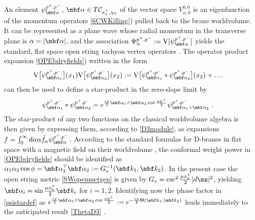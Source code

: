 An element $\psi_{\mbf\alpha}^{p^+,p^-}$, $\mbf\alpha\in
T\mathcal{C}_{x_0^+,\chi_0}$ of the vector space
$V_{\alpha,0}^{0,0}$ is an eigenfunction of the momentum operators
\eqref{6CWKilling}) pulled back to the brane worldvolume. It can be
represented as a plane wave whose radial momentum in the transverse
plane is $\alpha=|\mbf\alpha|$, and the association
$\Psi_{\alpha}^{p^+,p^-}:={\rm V}[\psi_{\mbf\alpha}^{p^+,p^-}]$ yields
the standard, flat space open string tachyon vertex
operators \cite{Schom1}. The operator product expansion
\eqref{OPEbdryfields}) written in the form
\begin{equation}
{\rm V}\bigl[\psi_{\mbf\alpha_1}^{p^+,p^-}\bigr](x_1) {\rm V}
\bigl[\psi_{\mbf\alpha_2}^{p^+,p^-}\bigr](x_2):={\rm V}
\bigl[\psi_{\mbf\alpha_1}^{p^+,p^-}*\psi_{\mbf\alpha_2}^{p^+,p^-}
\bigr](x_2)+\dots
\label{OPEstarform}\end{equation}
can then be used to define a star-product in the zero-slope limit by
\begin{equation}
  \label{psistardef}
  \psi_{\mbf\alpha_1}^{p^+,p^-}*\psi_{\mbf\alpha_2}^{p^+,p^-}=
  e^{\frac{ i\pi}2 \mbf\alpha_1\wedge\mbf\alpha_2 \cot\frac{\mu p^+}2}
  {} \psi_{\mbf\alpha_1+\mbf\alpha_2}^{p^+,p^-} \ \def\R{{\sf R}}
  {}.
\end{equation}
The star-product of any two functions on the classical worldvolume algebra
is then given by expressing them, according to \eqref{D3module}, as
expansions $f=\int_0^\infty d\alpha \alpha \tilde
f_\alpha \psi_{\mbf\alpha}^{p^+,p^-}$. According to the standard
formulas for D-branes in flat space with a magnetic field on their
worldvolume \cite{SW1}, the conformal weight power in
\eqref{OPEbdryfields} should be identified as
$\alpha_1 \alpha_2 \cos\phi=\mbf\alpha_1^\top \mbf\alpha_2:=
G_{\rm o}^{-1}(\mbf k_1,\mbf k_2)$. In the present case the open
string metric \eqref{SWopenmetgen} is given by $G_{\rm
  o}=\csc^2\frac{\mu x_0^+}2 | d\mz|^2$, yielding
$\mbf\alpha_i=\sin\frac{\mu x_0^+}2 \mbf k_i$ for
$i=1,2$. Identifying now the phase factor in \eqref{psistardef} as
$ e^{\frac{ i\pi}2 \mbf\alpha_1\wedge\mbf\alpha_2 
\cot\frac{\mu p^+}2}:=
 e^{-\frac{ i\pi}2 \Theta(\mbf k_1,\mbf k_2)}$ leads
immediately to the anticipated result \eqref{ThetaD3} \cite{DK2}.


